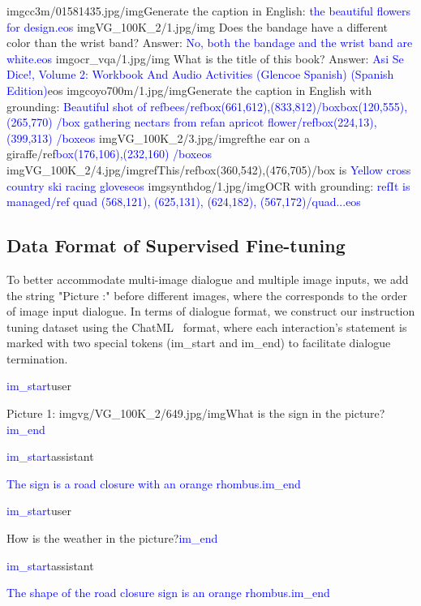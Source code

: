 \documentclass{article}
\begin{document}
\begin{tcolorbox}[colback=black!5!white,colframe=black!75!black,title=Image Captioning]
imgcc3m/01581435.jpg/imgGenerate the caption in English: \textcolor{blue}{the beautiful flowers for design.eos}
imgVG\_100K\_2/1.jpg/img Does the bandage have a different color than the wrist band? Answer: \textcolor{blue}{No, both the bandage and the wrist band are white.eos}
imgocr\_vqa/1.jpg/img What is the title of this book? Answer: \textcolor{blue}{Asi Se Dice!, Volume 2: Workbook And Audio Activities (Glencoe Spanish) (Spanish Edition)}eos
imgcoyo700m/1.jpg/imgGenerate the caption in English with grounding: \textcolor{blue}{Beautiful shot of refbees/refbox(661,612),(833,812)/boxbox(120,555),(265,770) /box gathering nectars from refan apricot flower/refbox(224,13),(399,313) /boxeos}
imgVG\_100K\_2/3.jpg/imgrefthe ear on a giraffe/ref\textcolor{blue}{box(176,106),(232,160) /boxeos}
imgVG\_100K\_2/4.jpg/imgrefThis/refbox(360,542),(476,705)/box is \textcolor{blue}{Yellow cross country ski racing gloveseos}
imgsynthdog/1.jpg/imgOCR with grounding: \textcolor{blue}{refIt is managed/ref quad (568,121), (625,131), (624,182), (567,172)/quad...eos}
\label{mt_format}
\end{tcolorbox}

\subsection{Data Format of Supervised Fine-tuning}
\label{app:data_format_stage3}

To better accommodate multi-image dialogue and multiple image inputs, we add the string "Picture :" before different images, where the  corresponds to the order of image input dialogue. In terms of dialogue format, we construct our instruction tuning dataset using the ChatML~\citep{chatml} format, where each interaction's statement is marked with two special tokens (im\_start and im\_end) to facilitate dialogue termination.

\begin{tcolorbox}[colback=black!5!white,colframe=black!75!black,title=The Dataset Format Example of ChatML]
\textcolor{blue}{im\_start}user

Picture 1: imgvg/VG\_100K\_2/649.jpg/imgWhat is the sign in the picture?\textcolor{blue}{im\_end}

\textcolor{blue}{im\_start}assistant

\textcolor{blue}{The sign is a road closure with an orange rhombus.im\_end}

\textcolor{blue}{im\_start}user

How is the weather in the picture?\textcolor{blue}{im\_end}

\textcolor{blue}{im\_start}assistant

\textcolor{blue}{The shape of the road closure sign is an orange rhombus.im\_end}
\end{tcolorbox}
\end{document}
